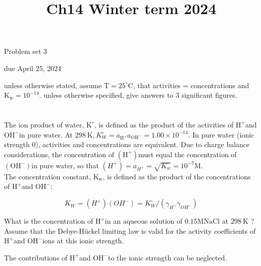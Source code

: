 \documentclass[12pt]{article}
\title{Ch14 Winter term 2024 }
\author{}
\date{}
\begin{document}
\maketitle
Problem set 3

due April 25, 2024

unless otherwise stated, assume $\mathrm{T}=25^{\circ} \mathrm{C}$, that activities = concentrations and $\mathrm{K}_{\mathrm{w}}=10^{-14}$. unless otherwise specified, give answers to 3 significant figures.

\section{}
The ion product of water, $\mathrm{K}^{\circ}$, is defined as the product of the activities of $\mathrm{H}^{+}$and $\mathrm{OH}^{-}$in pure water. At $298 \mathrm{~K}, K_{W}^{\circ}=a_{\mathrm{H}^{+}} a_{\mathrm{OH}^{-}}=1.00 \times 10^{-14}$. In pure water (ionic strength 0), activities and concentrations are equivalent. Due to charge balance considerations, the concentration of $\left(\mathrm{H}^{+}\right)$must equal the concentration of $\left(\mathrm{OH}^{-}\right)$in pure water, so that $\left(H^{+}\right)=a_{H^{+}}=\sqrt{K_{w}^{\circ}}=10^{-7} \mathrm{M}$.\\
The concentration constant, $\mathrm{K}_{\mathrm{w}}$, is defined as the product of the concentrations of $\mathrm{H}^{+}$and $\mathrm{OH}^{-}$:

$$
K_{W}=\left(H^{+}\right)\left(O H^{-}\right)=K_{W}^{\circ} /\left(\gamma_{H^{+}} \gamma_{O H^{-}}\right)
$$

What is the concentration of $\mathrm{H}^{+}$in an aqueous solution of $0.15 \mathrm{M} \mathrm{NaCl}$ at $298 \mathrm{~K}$ ? Assume that the Debye-Hückel limiting law is valid for the activity coefficients of $\mathrm{H}^{+}$and $\mathrm{OH}^{-}$ions at this ionic strength.

The contributions of $\mathrm{H}^{+}$and $\mathrm{OH}^{-}$to the ionic strength can be neglected.
\end{document}
